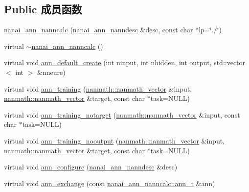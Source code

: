 \subsection*{Public 成员函数}
\begin{DoxyCompactItemize}
\item 
\hyperlink{classnanai_1_1nanai__ann__nanncalc_a0d26e7efdef5368c0212b3dd02f63767}{nanai\+\_\+ann\+\_\+nanncalc} (\hyperlink{namespacenanai_a892a8c80381d0005a076b68fbbf2d918}{nanai\+\_\+ann\+\_\+nanndesc} \&desc, const char $\ast$lp=\char`\"{}./\char`\"{})
\item 
virtual \hyperlink{classnanai_1_1nanai__ann__nanncalc_a2f5530f782f2585958c79c94bc3232d7}{$\sim$nanai\+\_\+ann\+\_\+nanncalc} ()
\item 
virtual void \hyperlink{classnanai_1_1nanai__ann__nanncalc_a9a2bdcebe0c659e6f6e3466674cc9143}{ann\+\_\+default\+\_\+create} (int ninput, int nhidden, int output, std\+::vector$<$ int $>$ \&nneure)
\item 
virtual void \hyperlink{classnanai_1_1nanai__ann__nanncalc_a0f2a230581dd2c530f35d22d1cd11982}{ann\+\_\+training} (\hyperlink{classnanmath_1_1nanmath__vector}{nanmath\+::nanmath\+\_\+vector} \&input, \hyperlink{classnanmath_1_1nanmath__vector}{nanmath\+::nanmath\+\_\+vector} \&target, const char $\ast$task=N\+U\+L\+L)
\item 
virtual void \hyperlink{classnanai_1_1nanai__ann__nanncalc_a95e5d9672cf1a74e4180389fbf41b899}{ann\+\_\+training\+\_\+notarget} (\hyperlink{classnanmath_1_1nanmath__vector}{nanmath\+::nanmath\+\_\+vector} \&input, const char $\ast$task=N\+U\+L\+L)
\item 
virtual void \hyperlink{classnanai_1_1nanai__ann__nanncalc_a2b1396b5691391e33859c17ab748a39d}{ann\+\_\+training\+\_\+nooutput} (\hyperlink{classnanmath_1_1nanmath__vector}{nanmath\+::nanmath\+\_\+vector} \&input, \hyperlink{classnanmath_1_1nanmath__vector}{nanmath\+::nanmath\+\_\+vector} \&target, const char $\ast$task=N\+U\+L\+L)
\item 
virtual void \hyperlink{classnanai_1_1nanai__ann__nanncalc_a8563aaf57e70ab959dcdec8961af9447}{ann\+\_\+configure} (\hyperlink{namespacenanai_a892a8c80381d0005a076b68fbbf2d918}{nanai\+\_\+ann\+\_\+nanndesc} \&desc)
\item 
virtual void \hyperlink{classnanai_1_1nanai__ann__nanncalc_a6ec3d7893411dcab2edf4e19ae3bb017}{ann\+\_\+exchange} (const \hyperlink{classnanai_1_1nanai__ann__nanncalc_1_1ann__t}{nanai\+\_\+ann\+\_\+nanncalc\+::ann\+\_\+t} \&ann)
\item 

\end{DoxyCompactItemize}
